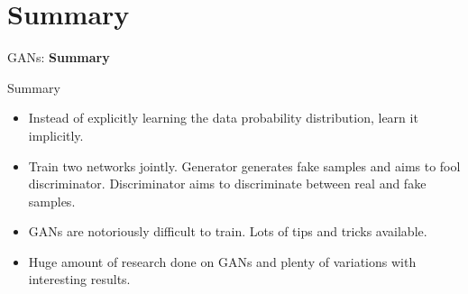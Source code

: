 \section{Summary}
\begin{frame}{}
    \LARGE GANs: \textbf{Summary}
\end{frame}

\begin{frame}{Summary}
\begin{itemize}
    \item Instead of explicitly learning the data probability distribution, learn it implicitly.
    \item Train two networks jointly. Generator generates fake samples and aims to fool discriminator. Discriminator aims to discriminate between real and fake samples.
    \item GANs are notoriously difficult to train. Lots of tips and tricks available.
    \item Huge amount of research done on GANs and plenty of variations with interesting results.
\end{itemize}
\end{frame}

